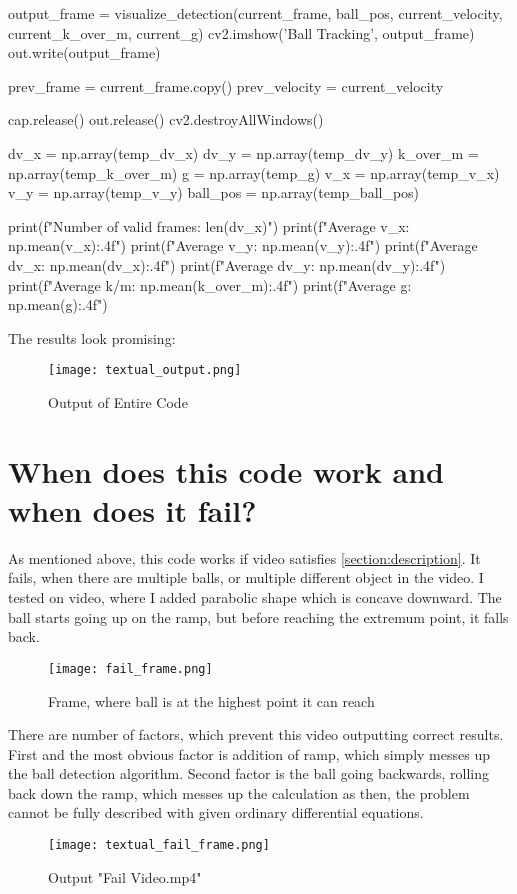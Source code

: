\documentclass{article}
\begin{document}
\begin{python}
	output_frame = visualize_detection(current_frame, ball_pos, current_velocity, current_k_over_m, current_g)
	cv2.imshow('Ball Tracking', output_frame)
	out.write(output_frame)
	
	prev_frame = current_frame.copy()
	prev_velocity = current_velocity
	
	cap.release()
	out.release()
	cv2.destroyAllWindows()
	
	dv_x = np.array(temp_dv_x)
	dv_y = np.array(temp_dv_y)
	k_over_m = np.array(temp_k_over_m)
	g = np.array(temp_g)
	v_x = np.array(temp_v_x)
	v_y = np.array(temp_v_y)
	ball_pos = np.array(temp_ball_pos)
	
	print(f"Number of valid frames: {len(dv_x)}")
	print(f"Average v_x: {np.mean(v_x):.4f}")
	print(f"Average v_y: {np.mean(v_y):.4f}")
	print(f"Average dv_x: {np.mean(dv_x):.4f}")
	print(f"Average dv_y: {np.mean(dv_y):.4f}")
	print(f"Average k/m: {np.mean(k_over_m):.4f}")
	print(f"Average g: {np.mean(g):.4f}")
\end{python}

	The results look promising:
	
	\begin{figure}[H]
		\centering
		\texttt{[image: textual\_output.png]}
		\caption{Output of Entire Code}
	\end{figure}

	\section{When does this code work and when does it fail?}
	
	As mentioned above, this code works if video satisfies \ref{section:description}. It fails, when there are multiple balls, or multiple different object in the video. I tested on video, where I added parabolic shape which is concave downward. The ball starts going up on the ramp, but before reaching the extremum point, it falls back. 
	
	\begin{figure}[H]
		\centering
		\texttt{[image: fail\_frame.png]}
		\caption{Frame, where ball is at the highest point it can reach}
	\end{figure}

	There are number of factors, which prevent this video outputting correct results. First and the most obvious factor is addition of ramp, which simply messes up the ball detection algorithm. Second factor is the ball going backwards, rolling back down the ramp, which messes up the calculation as then, the problem cannot be fully described with given ordinary differential equations. 

	\begin{figure}[H]
		\centering
		\texttt{[image: textual\_fail\_frame.png]}
		\caption{Output "Fail Video.mp4"}
	\end{figure}
\end{document}

